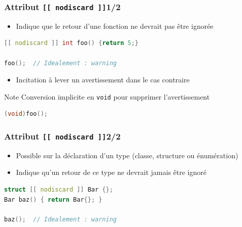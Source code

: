 \documentclass[C++.tex]{subfiles}
\begin{document}
\begin{frame}[fragile]
	\frametitle{Attribut \lstinline|[[ nodiscard ]]|\titlehfill{}1/2}
	\begin{itemize}
		\item Indique que le retour d'une fonction ne devrait pas être ignorée
	\end{itemize}

	\begin{lstlisting}[language=C++]
[[ nodiscard ]] int foo() {return 5;}

foo();  // Idealement : warning\end{lstlisting}

	\begin{itemize}
		\item Incitation à lever un avertissement dans le cas contraire
	\end{itemize}

	\begin{block}{Note}
		Conversion implicite en \lstinline|void| pour supprimer l'avertissement
		\begin{lstlisting}[language=C++]
(void)foo();\end{lstlisting}

	\end{block}
\end{frame}

\begin{frame}[fragile]
	\frametitle{Attribut \lstinline|[[ nodiscard ]]|\titlehfill{}2/2}
	\begin{itemize}
		\item Possible sur la déclaration d'un type (classe, structure ou énumération)
		\item Indique qu'un retour de ce type ne devrait jamais être ignoré
	\end{itemize}

	\begin{lstlisting}[language=C++]
struct [[ nodiscard ]] Bar {};
Bar baz() { return Bar{}; }

baz();  // Idealement : warning\end{lstlisting}
\end{frame}
\end{document}
